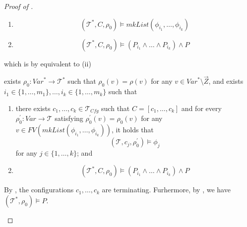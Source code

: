 \documentclass{article}
\newcommand{\Tcfg}{\mathcal{T}_{\mathit{Cfg}}}
\newenvironment{proofenv}
  {
    \VerbatimEnvironment\begin{tcolorbox}[colback=black!0!white] %
  }
  {
   \end{tcolorbox}
  }
\begin{document}
\begin{proof}[Proof of ]
\begin{enumerate}
\begin{proofenv}
    \begin{enumerate}
        \item 
        \begin{equation*}
            (\mathcal{T}^*, C, \rho_0) \vDash \mathit{mkList}(\phi_{i_1}, \ldots, \phi_{i_k})
        \end{equation*}
        \item 
        \begin{equation*}
            (\mathcal{T}^*, C, \rho_0) \vDash (P_{i_1} \land \ldots \land P_{i_k}) \land P
        \end{equation*}
    \end{enumerate}
    \end{proofenv}
    which is by  equivalent to (ii)
    \begin{proofenv}
    exists $\rho_0 : \mathit{Var}^* \to \mathcal{T}^*$ such that $\rho_0(v) = \rho(v)$ for any $v \in \mathit{Var}^* \setminus \vec{Z}$, and exists $i_1 \in \{ 1, \ldots, m_1 \}, \ldots, i_k \in \{ 1, \ldots, m_k \}$ such that
    \begin{enumerate}
        \item there exists $c_1,\ldots,c_k \in \Tcfg$ such that $C = [c_1,\ldots,c_k]$
        and for every $\rho_0^\prime : \mathit{Var} \to \mathcal{T}$ satisfying $\rho_0^\prime(v) = \rho_0(v)$
        for any $v \in \mathit{FV}(\mathit{mkList}(\phi_{i_1}, \ldots, \phi_{i_k}))$, it holds that
        \begin{equation*}
            (\mathcal{T}, c_j, \rho_0^\prime) \vDash \phi_j
        \end{equation*}
        for any $j \in \{ 1, \ldots, k \}$; and
        \item
        \begin{equation*}
            (\mathcal{T}^*, C, \rho_0) \vDash (P_{i_1} \land \ldots \land P_{i_k}) \land P
        \end{equation*}
    \end{enumerate}
    \end{proofenv}
    By , the configurations $c_1, \ldots, c_k$ are terminating.
    Furhermore, by , we have $(\mathcal{T}^*, \rho_0) \vDash P$.

\end{enumerate}
\end{proof}
\end{document}
